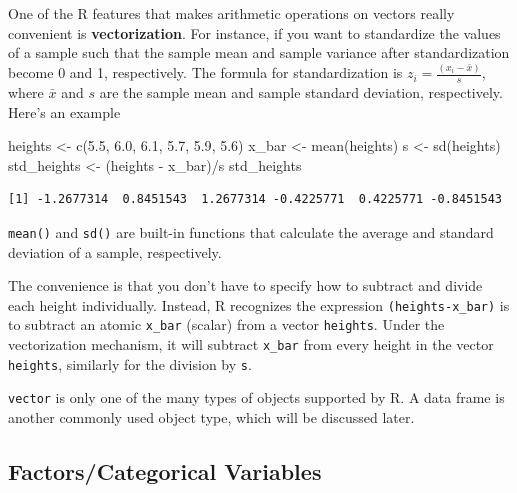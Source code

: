 \documentclass[
  letterpaper,
  DIV=11,
  numbers=noendperiod]{scrreprt}
\newenvironment{Shaded}{\begin{snugshade}}{\end{snugshade}}
\newcommand{\FloatTok}[1]{\textcolor[rgb]{0.68,0.00,0.00}{#1}}
\newcommand{\FunctionTok}[1]{\textcolor[rgb]{0.28,0.35,0.67}{#1}}
\newcommand{\NormalTok}[1]{\textcolor[rgb]{0.00,0.23,0.31}{#1}}
\newcommand{\OtherTok}[1]{\textcolor[rgb]{0.00,0.23,0.31}{#1}}
\newcommand{\SpecialCharTok}[1]{\textcolor[rgb]{0.37,0.37,0.37}{#1}}
\begin{document}
One of the R features that makes arithmetic operations on vectors really
convenient is \textbf{vectorization}. For instance, if you want to
standardize the values of a sample such that the sample mean and sample
variance after standardization become 0 and 1, respectively. The formula
for standardization is \(z_{i}=\frac{(x_{i}-\bar{x})}{s}\), where
\(\bar{x}\) and \(s\) are the sample mean and sample standard deviation,
respectively. Here's an example

\begin{Shaded}
\begin{Highlighting}[]
\NormalTok{heights }\OtherTok{\textless{}{-}} \FunctionTok{c}\NormalTok{(}\FloatTok{5.5}\NormalTok{, }\FloatTok{6.0}\NormalTok{, }\FloatTok{6.1}\NormalTok{, }\FloatTok{5.7}\NormalTok{, }\FloatTok{5.9}\NormalTok{, }\FloatTok{5.6}\NormalTok{)}
\NormalTok{x\_bar }\OtherTok{\textless{}{-}} \FunctionTok{mean}\NormalTok{(heights)}
\NormalTok{s }\OtherTok{\textless{}{-}} \FunctionTok{sd}\NormalTok{(heights)}
\NormalTok{std\_heights }\OtherTok{\textless{}{-}}\NormalTok{ (heights }\SpecialCharTok{{-}}\NormalTok{ x\_bar)}\SpecialCharTok{/}\NormalTok{s}
\NormalTok{std\_heights}
\end{Highlighting}
\end{Shaded}

\begin{verbatim}
[1] -1.2677314  0.8451543  1.2677314 -0.4225771  0.4225771 -0.8451543
\end{verbatim}

\texttt{mean()} and \texttt{sd()} are built-in functions that calculate
the average and standard deviation of a sample, respectively.

The convenience is that you don't have to specify how to subtract and
divide each height individually. Instead, R recognizes the expression
\texttt{(heights-x\_bar)} is to subtract an atomic \texttt{x\_bar}
(scalar) from a vector \texttt{heights}. Under the vectorization
mechanism, it will subtract \texttt{x\_bar} from every height in the
vector \texttt{heights}, similarly for the division by \texttt{s}.

\texttt{vector} is only one of the many types of objects supported by R.
A data frame is another commonly used object type, which will be
discussed later.

\subsection{Factors/Categorical Variables}\label{sec-factor-levels}
\end{document}

